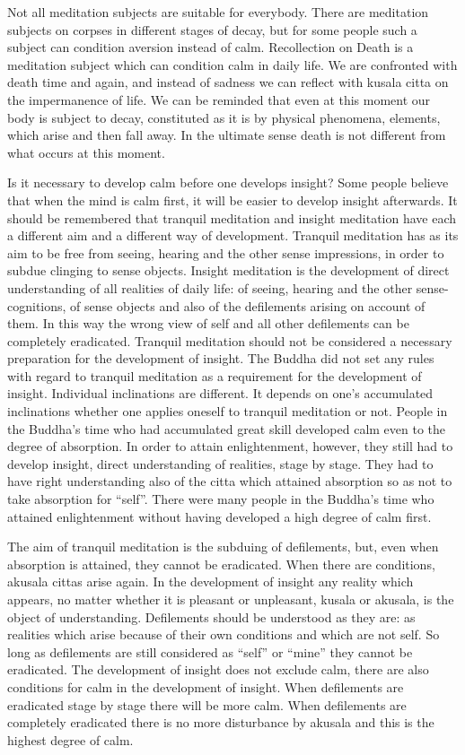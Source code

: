 \documentclass{book}
\begin{document}
Not all meditation subjects are suitable for everybody. There are
meditation subjects on corpses in different stages of decay, but for
some people such a subject can condition aversion instead of calm.
Recollection on Death is a meditation subject which can condition calm
in daily life. We are confronted with death time and again, and instead
of sadness we can reflect with kusala citta on the impermanence of life.
We can be reminded that even at this moment our body is subject to
decay, constituted as it is by physical phenomena, elements, which arise
and then fall away. In the ultimate sense death is not different from
what occurs at this moment.

Is it necessary to develop calm before one develops insight? Some people
believe that when the mind is calm first, it will be easier to develop
insight afterwards. It should be remembered that tranquil meditation and
insight meditation have each a different aim and a different way of
development. Tranquil meditation has as its aim to be free from seeing,
hearing and the other sense impressions, in order to subdue clinging to
sense objects. Insight meditation is the development of direct
under­standing of all realities of daily life: of seeing, hearing and
the other sense-cognitions, of sense objects and also of the
defilements arising on account of them. In this way the wrong view of
self and all other defilements can be completely eradicated. Tranquil
meditation should not be considered a necessary preparation for the
development of insight. The Buddha did not set any rules with regard to
tranquil meditation as a requirement for the development of insight.
Individual inclinations are different. It depends on one's accumulated
inclinations whether one applies oneself to tranquil meditation or not.
People in the Buddha's time who had accumulated great skill developed
calm even to the degree of absorption. In order to attain enlightenment,
however, they still had to develop insight, direct understanding of
realities, stage by stage. They had to have right understanding also of
the citta which attained absorption so as not to take absorption for
``self''. There were many people in the Buddha's time who attained
enlightenment without having developed a high degree of calm first.

The aim of tranquil meditation is the subduing of defilements, but, even
when absorption is attained, they cannot be eradicated. When there are
conditions, akusala cittas arise again. In the development of insight
any reality which appears, no matter whether it is pleasant or
unpleasant, kusala or akusala, is the object of under­standing.
Defilements should be understood as they are: as realities which arise
because of their own conditions and which are not self. So long as
defilements are still considered as ``self'' or ``mine'' they cannot be
eradicated. The development of insight does not exclude calm, there are
also conditions for calm in the development of insight. When defilements
are eradicated stage by stage there will be more calm. When defilements
are completely eradicated there is no more disturbance by akusala and
this is the highest degree of calm.
\end{document}
